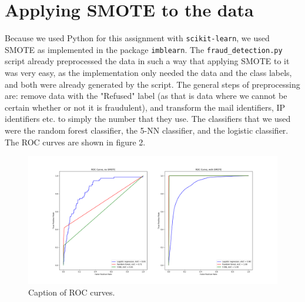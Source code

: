 \documentclass[]{article}
\begin{document}
\section{Applying SMOTE to the data}
Because we used Python for this assignment with \texttt{scikit-learn}, we used SMOTE as implemented in the package \texttt{imblearn}. The \texttt{fraud\_detection.py} script already preprocessed the data in such a way that applying SMOTE to it was very easy, as the implementation only needed the data and the class labels, and both were already generated by the script. The general steps of preprocessing are: remove data with the "Refused" label (as that is data where we cannot be certain whether or not it is fraudulent), and transform the mail identifiers, IP identifiers etc. to simply the number that they use. The classifiers that we used were the random forest classifier, the 5-NN classifier, and the logistic classifier. The ROC curves are shown in figure 2.
\begin{figure}[h!]
	\centering
	\includegraphics[scale = 0.3]{Visualizations/ROC_curves}
	\caption{Caption of ROC curves.}
\end{figure}
\end{document}
